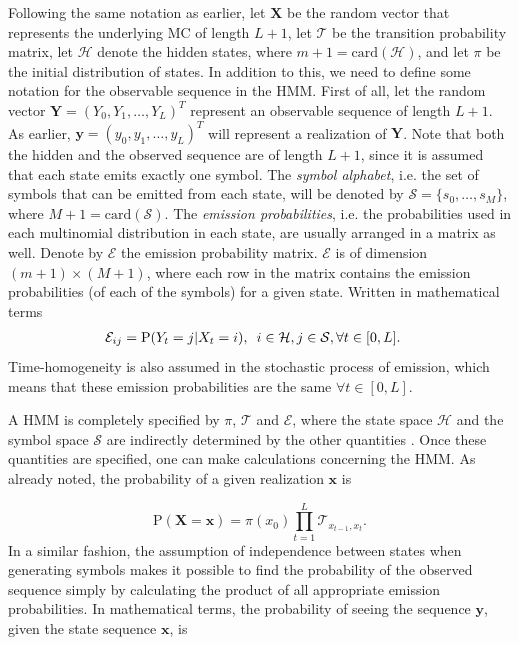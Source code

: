 \documentclass{article}\usepackage[]{graphicx}\usepackage[]{color}
\begin{document}
Following the same notation as earlier, let $\mathbf{X}$ be the random vector that represents the underlying MC of length $L+1$, let $\mathcal{T}$ be the transition probability matrix, let $\mathcal{H}$ denote the hidden states, where $m+1 = \text{card}(\mathcal{H})$, and let $\pi$ be the initial distribution of states. In addition to this, we need to define some notation for the observable sequence in the HMM. First of all, let the random vector $\mathbf{Y} = (Y_0, Y_1, \ldots, Y_L)^T$ represent an observable sequence of length $L+1$. As earlier, $\mathbf{y} = (y_0, y_1, \ldots, y_L)^T$ will represent a realization of $\mathbf{Y}$. Note that both the hidden and the observed sequence are of length $L+1$, since it is assumed that each state emits exactly one symbol. The \textit{symbol alphabet}, i.e. the set of symbols that can be emitted from each state, will be denoted by $\mathcal{S} = \{s_0, \ldots, s_M\}$, where $M+1 = \text{card}(\mathcal{S})$. The \textit{emission probabilities}, i.e. the probabilities used in each multinomial distribution in each state, are usually arranged in a matrix as well. Denote by $\mathcal{E}$ the emission probability matrix. $\mathcal{E}$ is of dimension $(m+1) \times (M+1)$, where each row in the matrix contains the emission probabilities (of each of the symbols) for a given state. Written in mathematical terms 
\begin{align*}
    \mathcal{E}_{ij} &= \text{P}(Y_t = j|X_t = i), \hspace{0.5em} i \in \mathcal{H}, j \in \mathcal{S}, \forall t \in [0,L].
\end{align*}
Time-homogeneity is also assumed in the stochastic process of emission, which means that these emission probabilities are the same $\forall t \in [0, L]$. 

A HMM is completely specified by $\pi$, $\mathcal{T}$ and $\mathcal{E}$, where the state space $\mathcal{H}$ and the symbol space $\mathcal{S}$ are indirectly determined by the other quantities \cite{Eddy04}. Once these quantities are specified, one can make calculations concerning the HMM. As already noted, the probability of a given realization $\mathbf{x}$ is 

\begin{equation}
    \text{P}(\mathbf{X} = \mathbf{x}) = \pi(x_0)\prod_{t=1}^L\mathcal{T}_{x_{t-1}, x_t}.
    \label{ProbHiddenMC}
\end{equation}
In a similar fashion, the assumption of independence between states when generating symbols makes it possible to find the probability of the observed sequence simply by calculating the product of all appropriate emission probabilities. In mathematical terms, the probability of seeing the sequence $\mathbf{y}$, given the state sequence $\mathbf{x}$, is 
\end{document}
